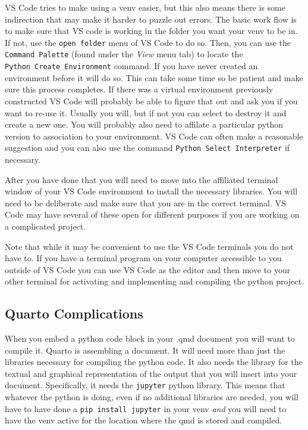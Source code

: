 \documentclass[
  letterpaper,
  DIV=11,
  numbers=noendperiod]{scrreprt}
\begin{document}
VS Code tries to make using a venv easier, but this also means there is
some indirection that may make it harder to puzzle out errors. The basic
work flow is to make sure that VS code is working in the folder you want
your venv to be in. If not, use the \texttt{open\ folder} menu of VS
Code to do so. Then, you can use the \texttt{Command\ Palette} (found
under the \emph{View} menu tab) to locate the
\texttt{Python\ Create\ Environment} command. If you have never created
an environment before it will do so. This can take some time so be
patient and make sure this process completes. If there was a virtual
environment previously constructed VS Code will probably be able to
figure that out and ask you if you want to re-use it. Usually you will,
but if not you can select to destroy it and create a new one. You will
probably also need to affilate a particular python version to
association to your environment. VS Code can often make a reasonable
suggestion and you can also use the command
\texttt{Python\ Select\ Interpreter} if necessary.

After you have done that you will need to move into the affiliated
terminal window of your VS Code environment to install the necessary
libraries. You will need to be deliberate and make sure that you are in
the correct terminal. VS Code may have several of these open for
different purposes if you are working on a complicated project.

Note that while it may be convenient to use the VS Code terminals you do
not have to. If you have a terminal program on your computer accessible
to you outside of VS Code you can use VS Code as the editor and then
move to your other terminal for activating and implementing and
compiling the python project.

\subsection{Quarto Complications}\label{quarto-complications}

When you embed a python code block in your .qmd document you will want
to compile it. Quarto is assembling a document. It will need more than
just the libraries necessary for compiling the python code. It also
needs the library for the textual and graphical representation of the
output that you will insert into your document. Specifically, it needs
the \texttt{jupyter} python library. This means that whatever the python
is doing, even if no additional libraries are needed, you will have to
have done a \texttt{pip\ install\ jupyter} in your venv \emph{and} you
will need to have the venv active for the location where the qmd is
stored and compiled.
\end{document}
